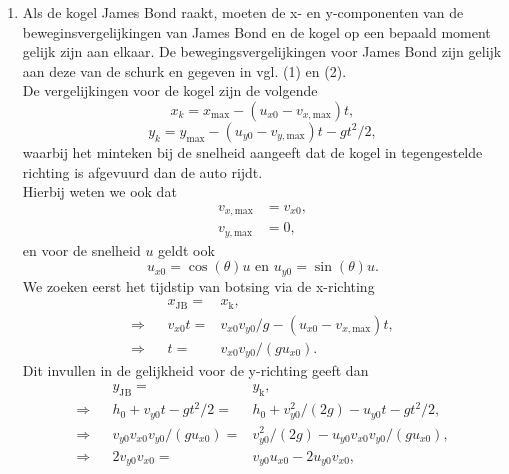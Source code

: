 \documentclass[a4paper,11pt]{article}
\begin{document}
\begin{enumerate}[label=(\alph*)]
    \item Als de kogel James Bond raakt, moeten de x- en y-componenten van de beweginsvergelijkingen van James Bond en de kogel op een bepaald moment gelijk zijn aan elkaar. De bewegingsvergelijkingen voor James Bond zijn gelijk aan deze van de schurk en gegeven in vgl. (1) en (2).\\
    De vergelijkingen voor de kogel zijn de volgende
    \begin{equation}
        x_k = x_{\text{max}} - (u_{x0}-v_{x,\text{max}})t,
    \end{equation}
    \begin{equation}
        y_k = y_{\text{max}} - (u_{y0}-v_{y,\text{max}})t - gt^2/2,
    \end{equation}
    waarbij het minteken bij de snelheid aangeeft dat de kogel in tegengestelde richting is afgevuurd dan de auto rijdt.\\
    Hierbij weten we ook dat 
    \begin{equation}
        \begin{split}
           v_{x,\text{max}} &= v_{x0},\\
           v_{y,\text{max}} &= 0,
        \end{split}
    \end{equation}
    en voor de snelheid $u$ geldt ook
    \begin{equation}
        u_{x0} = \cos(\theta) u \text{ en } u_{y0} = \sin(\theta) u.
    \end{equation}
    We zoeken eerst het tijdstip van botsing via de x-richting
    \begin{align}
    	&&x_{\text{JB}} =& x_{\text{k}},\\
        \Rightarrow&& v_{x0} t =& v_{x0} v_{y0}/g - (u_{x0}-v_{x,\text{max}})t,\\
        \Rightarrow&&t =& v_{x0} v_{y0}/(gu_{x0}).
    \end{align}
    Dit invullen in de gelijkheid voor de y-richting geeft dan
    \begin{align}
            &&y_{\text{JB}} =& y_{\text{k}},\\
            \Rightarrow&& h_0 + v_{y0} t - gt^2/2 =& h_0 + v_{y0}^2 / (2g) - u_{y0}t- gt^2/2,\\
            \Rightarrow&&v_{y0} v_{x0} v_{y0}/(gu_{x0}) =& v_{y0}^2 / (2g) - u_{y0} v_{x0} v_{y0}/(gu_{x0}),\\
            \Rightarrow&&2v_{y0} v_{x0} =& v_{y0} u_{x0} - 2u_{y0} v_{x0} ,\\

\end{align}
\end{enumerate}
\end{document}
